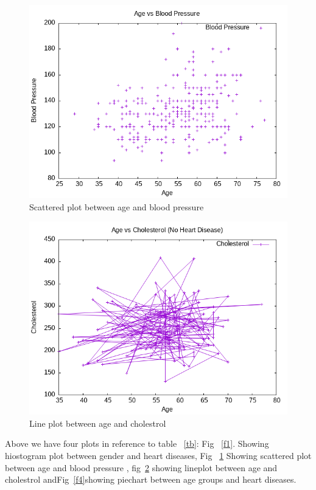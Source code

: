 \documentclass{article}
\begin{document}
\begin{figure}
	\includegraphics[width=\textwidth]{age_vs_blood_pressure.png}
	\caption{Scattered plot between age and blood pressure}
	\label{f2}
\end{figure}
 
 \begin{figure}
 	\includegraphics[width=\textwidth]{age_vs_chol_no_disease.png}
 	\caption{Line plot between age and cholestrol}
 	\label{f3}
 \end{figure}

	
		
	 Above we have four plots in reference to table ~\ref{tb}: Fig ~\ref{f1}. Showing hiostogram plot between gender and heart diseases, Fig ~\ref{f2} Showing scattered plot between age and blood pressure , fig~\ref{f3} showing lineplot between age and cholestrol andFig~\ref{f4}showing piechart between age groups and heart diseases.
\end{document}
